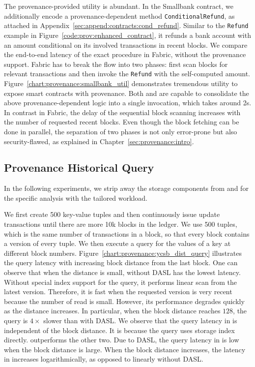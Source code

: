 The provenance-provided utility is abundant. In the Smallbank contract, we additionally encode a provenance-dependent method \texttt{ConditionalRefund}, as attached in Appendix~\ref{sec:append:contracts:cond_refund}.
Similar to the \texttt{Refund} example in Figure~\ref{code:prov:enhanced_contract},
it refunds a bank account with an amount conditional on its involved transactions in recent blocks.
We compare the end-to-end latency of the exact procedure in Fabric, without the provenance support.
Fabric has to break the flow into two phases: first scan blocks for relevant transactions and then invoke the \texttt{Refund} with the self-computed amount.
Figure~\ref{chart:provenance:smallbank_util} demonstrates tremendous utility to expose smart contracts with provenance.
Both {\fsO} and {\fsPrO} are capable to consolidate the above provenance-dependent logic into a single invocation, which takes around 2s. 
In contrast in Fabric, the delay of the sequential block scanning increases with the number of requested recent blocks. 
Even though the block fetching can be done in parallel, 
the separation of two phases is not only error-prone but also security-flawed, as explained in Chapter~\ref{sec:provenance:intro}.

\subsection{Provenance Historical Query}
In the following experiments, we strip away the storage components from {\fsO} and {\fsPrO} for the specific analysis with the tailored workload. 

We first create 500 key-value tuples and then continuously issue update transactions until there are more 10k blocks in the ledger. We use 500 tuples, which is the same number of transactions in a block, so that every block contains a version of every tuple.  
We then execute a query for
the values of a key at different block numbers. Figure~\ref{chart:provenance:ycsb_dist_query} illustrates the query latency with  
increasing block distance from the last block. One can observe that when the distance is small, {\fsO} without DASL has the lowest latency. Without special index support for the query, it performs linear scan from the latest
version. Therefore, it is fast when the requested version is very recent because the number of read is small.
However, its performance degrades quickly as the distance increases. In particular, when the block distance
reaches $128$, the query is $4\times$ slower than {\fsO} with DASL. We observe that the query latency in
{\fsPrO} is independent of the block distance. It is because the query uses storage index directly. {\fsO}
outperforms the other two. Due to DASL, the query latency in {\fsO} is low when the block distance is
large. When the block distance increases, the latency in {\fsO} increases logarithmically, as opposed to
linearly without DASL.  


